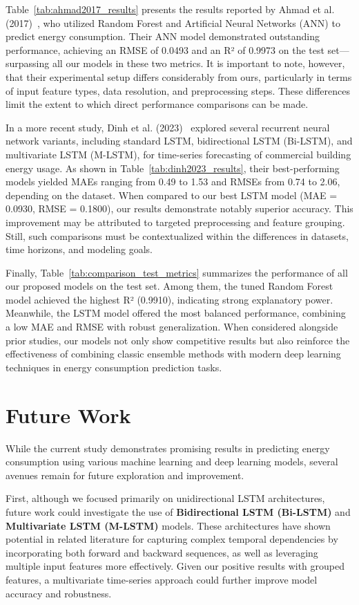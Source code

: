 Table~\ref{tab:ahmad2017_results} presents the results reported by Ahmad et al. (2017)~\cite{ahmad2017random}, who utilized Random Forest and Artificial Neural Networks (ANN) to predict energy consumption. Their ANN model demonstrated outstanding performance, achieving an RMSE of 0.0493 and an R² of 0.9973 on the test set—surpassing all our models in these two metrics. It is important to note, however, that their experimental setup differs considerably from ours, particularly in terms of input feature types, data resolution, and preprocessing steps. These differences limit the extent to which direct performance comparisons can be made.

In a more recent study, Dinh et al. (2023)~\cite{khan2024image} explored several recurrent neural network variants, including standard LSTM, bidirectional LSTM (Bi-LSTM), and multivariate LSTM (M-LSTM), for time-series forecasting of commercial building energy usage. As shown in Table~\ref{tab:dinh2023_results}, their best-performing models yielded MAEs ranging from 0.49 to 1.53 and RMSEs from 0.74 to 2.06, depending on the dataset. When compared to our best LSTM model (MAE = 0.0930, RMSE = 0.1800), our results demonstrate notably superior accuracy. This improvement may be attributed to targeted preprocessing and feature grouping. Still, such comparisons must be contextualized within the differences in datasets, time horizons, and modeling goals.

Finally, Table~\ref{tab:comparison_test_metrics} summarizes the performance of all our proposed models on the test set. Among them, the tuned Random Forest model achieved the highest R² (0.9910), indicating strong explanatory power. Meanwhile, the LSTM model offered the most balanced performance, combining a low MAE and RMSE with robust generalization. When considered alongside prior studies, our models not only show competitive results but also reinforce the effectiveness of combining classic ensemble methods with modern deep learning techniques in energy consumption prediction tasks.

\section{Future Work}

While the current study demonstrates promising results in predicting energy consumption using various machine learning and deep learning models, several avenues remain for future exploration and improvement.

First, although we focused primarily on unidirectional LSTM architectures, future work could investigate the use of \textbf{Bidirectional LSTM (Bi-LSTM)} and \textbf{Multivariate LSTM (M-LSTM)} models. These architectures have shown potential in related literature for capturing complex temporal dependencies by incorporating both forward and backward sequences, as well as leveraging multiple input features more effectively. Given our positive results with grouped features, a multivariate time-series approach could further improve model accuracy and robustness.

